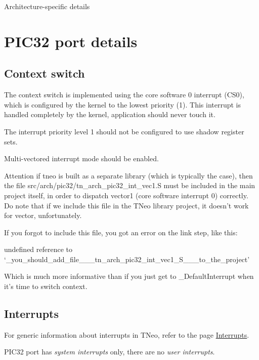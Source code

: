 Architecture-\/specific details\hypertarget{arch_specific_pic32_details}{}\section{P\+I\+C32 port details}\label{arch_specific_pic32_details}
\hypertarget{arch_specific_pic32_context_switch}{}\subsection{Context switch}\label{arch_specific_pic32_context_switch}
The context switch is implemented using the core software 0 interrupt ({\ttfamily C\+S0}), which is configured by the kernel to the lowest priority (1). This interrupt is handled completely by the kernel, application should never touch it.

The interrupt priority level 1 should not be configured to use shadow register sets.

Multi-\/vectored interrupt mode should be enabled.

\begin{DoxyAttention}{Attention}
if tneo is built as a separate library (which is typically the case), then the file {\ttfamily src/arch/pic32/tn\+\_\+arch\+\_\+pic32\+\_\+int\+\_\+vec1.\+S} must be included in the main project itself, in order to dispatch vector1 (core software interrupt 0) correctly. Do note that if we include this file in the T\+Neo library project, it doesn't work for vector, unfortunately.

If you forgot to include this file, you got an error on the link step, like this\+: 
\begin{DoxyCode}
undefined reference to `\_you\_should\_add\_file\_\_\_tn\_arch\_pic32\_int\_vec1\_S\_\_\_to\_the\_project\textcolor{stringliteral}{'}
\end{DoxyCode}
 Which is much more informative than if you just get to {\ttfamily \+\_\+\+Default\+Interrupt} when it's time to switch context.
\end{DoxyAttention}
\hypertarget{arch_specific_pic32_interrupts}{}\subsection{Interrupts}\label{arch_specific_pic32_interrupts}
For generic information about interrupts in T\+Neo, refer to the page \hyperlink{interrupts}{Interrupts}.

P\+I\+C32 port has {\itshape system interrupts} only, there are no {\itshape user interrupts}.

